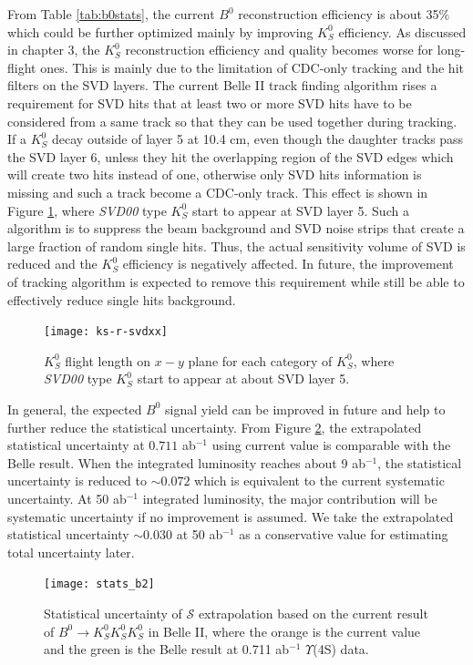 From Table \ref{tab:b0stats}, the current $B^0$ reconstruction efficiency is about 35\% which could be further optimized mainly by improving $K_S^0$ efficiency. As discussed in chapter 3, the $K_S^0$ reconstruction efficiency and quality becomes worse for long-flight ones. This is mainly due to the limitation of CDC-only tracking and the hit filters on the SVD layers. The current Belle II track finding algorithm rises a requirement for SVD hits that at least two or more SVD hits have to be considered from a same track so that they can be used together during tracking. If a $K_S^0$ decay outside of layer 5 at 10.4 cm, even though the daughter tracks pass the SVD layer 6, unless they hit the overlapping region of the SVD edges which will create two hits instead of one, otherwise only SVD hits information is missing and such a track become a CDC-only track. This effect is shown in Figure \ref{fig:svd-r-xx}, where \textit{SVD00} type $K_S^0$ start to appear at SVD layer 5. Such a algorithm is to suppress the beam background and SVD noise strips that create a large fraction of random single hits. Thus, the actual sensitivity volume of SVD is reduced and the $K_S^0$ efficiency is negatively affected. 
In future, the improvement of tracking algorithm is expected to remove this requirement while still be able to effectively reduce single hits background.

\begin{figure}[htpb]
	\centering
	\texttt{[image: ks-r-svdxx]}
	\caption{$K_S^0$ flight length on $x-y$ plane for each category of $K_S^0$, where \textit{SVD00} type $K_S^0$ start to appear at about SVD layer 5.}
	\label{fig:svd-r-xx}
\end{figure}




In general, the expected $B^0$ signal yield can be improved in future and help to further reduce the statistical uncertainty. From Figure \ref{fig:stats_future}, the extrapolated statistical uncertainty at $0.711$ ab$^{-1}$ using current value is comparable with the Belle result. 
When the integrated luminosity reaches about 9 ab$^{-1}$, the statistical uncertainty is reduced to $\sim 0.072$ which is equivalent to the current systematic uncertainty. At 50 ab$^{-1}$ integrated luminosity, the major contribution will be systematic uncertainty if no improvement is assumed. We take the extrapolated statistical uncertainty $\sim 0.030$ at 50 ab$^{-1}$ as a conservative value for estimating total uncertainty later.

\begin{figure}[htpb]
\centering
\texttt{[image: stats\_b2]}
\caption{Statistical uncertainty of $\mathcal{S}$ extrapolation based on the current result of $B^0 \to K_S^0  K_S^0  K_S^0$ in Belle II, where the orange is the current value and the green is the Belle result at 0.711 ab$^{-1}$ $\Upsilon$(4S) data.}
\label{fig:stats_future}
\end{figure}


